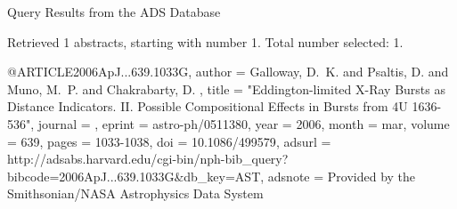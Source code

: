 Query Results from the ADS Database


Retrieved 1 abstracts, starting with number 1.  Total number selected: 1.

@ARTICLE{2006ApJ...639.1033G,
   author = {{Galloway}, D.~K. and {Psaltis}, D. and {Muno}, M.~P. and {Chakrabarty}, D.
	},
    title = "{Eddington-limited X-Ray Bursts as Distance Indicators. II. Possible Compositional Effects in Bursts from 4U 1636-536}",
  journal = {\apj},
   eprint = {astro-ph/0511380},
     year = 2006,
    month = mar,
   volume = 639,
    pages = {1033-1038},
      doi = {10.1086/499579},
   adsurl = {http://adsabs.harvard.edu/cgi-bin/nph-bib_query?bibcode=2006ApJ...639.1033G&db_key=AST},
  adsnote = {Provided by the Smithsonian/NASA Astrophysics Data System}
}


